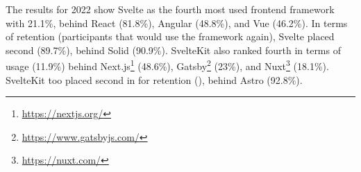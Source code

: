 The results for 2022 show Svelte as the fourth most used frontend framework with 21.1\%, behind React (81.8\%), Angular (48.8\%), and Vue (46.2\%). In terms of retention (participants that would use the framework again), Svelte placed second (89.7\%), behind Solid (90.9\%). SvelteKit also ranked fourth in terms of usage (11.9\%) behind Next.js\footnote{\url{https://nextjs.org/}} (48.6\%), Gatsby\footnote{\url{https://www.gatsbyjs.com/}} (23\%), and Nuxt\footnote{\url{https://nuxt.com/}} (18.1\%). SvelteKit too placed second in for retention (), behind Astro (92.8\%).    




